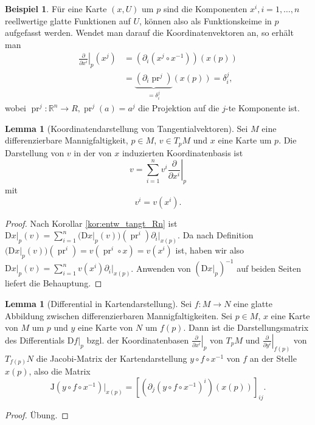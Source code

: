 \documentclass[a4paper]{scrreprt}
\numberwithin{equation}{chapter}
\newcommand{\DD}{\mathrm{D}}
\DeclareMathOperator{\pr}{pr}
\theoremstyle{definition}
\newtheorem{lemma}[defn]{Lemma}
\newtheorem{bsp}[defn]{Beispiel}
\newcommand{\bewUeb}{\begin{proof}Übung.\end{proof}}
\begin{document}
\begin{bsp}
	Für eine Karte $(x,U)$ um $p$ sind die Komponenten $x^i, i = 1,\dots, n$ reellwertige glatte Funktionen auf $U$, können also als Funktionskeime in $p$ aufgefasst werden. Wendet man darauf die Koordinatenvektoren an, so erhält man
	\begin{align*}
		\left.\frac{\partial}{\partial x^i}\right|_p (x^j) &= \left(\partial_i \left(x^j\circ x^{-1}\right)\right) (x(p))\\
		&= \underbrace{\left(\partial_i \pr^j\right)}_{= \delta^j_i} (x(p)) = \delta^j_i,
	\end{align*}
	wobei $\pr^j\colon \mathbb R^n \to R, \pr^j(a) = a^j$ die Projektion auf die $j$-te Komponente ist.
\end{bsp}

\begin{lemma}[Koordinatendarstellung von Tangentialvektoren]
	Sei $M$ eine differenzierbare Mannigfaltigkeit, $p \in M$, $v \in T_pM$ und $x$ eine Karte um $p$. Die Darstellung von $v$ in der von $x$ induzierten Koordinatenbasis ist
	\[v = \sum_{i=1}^n v^i \left.\frac{\partial}{\partial x^i}\right|_p\]
	mit
	\[v^i = v(x^i).\]

	\begin{proof}
		Nach Korollar \ref{kor:entw_tangt_Rn} ist $\left.\DD x\right|_p(v) = \sum_{i=1}^n \Big(\DD x\big|_p(v)\Big) (\pr^i) \left.\partial_i\right|_{x(p)}$. Da nach Definition $\Big(\DD x\big|_p(v)\Big) (\pr^i) = v(\pr^i \circ x) = v(x^i)$ ist, haben wir also $\left.\DD x\right|_p(v) = \sum_{i=1}^n v(x^i) \left.\partial_i\right|_{x(p)}$.
		Anwenden von $\left(\left.\DD x\right|_p\right)^{-1}$ auf beiden Seiten liefert die Behauptung.
	\end{proof}
\end{lemma}

\begin{lemma}[Differential in Kartendarstellung] \label{lemma:differential_koord}
	Sei $f\colon M \to N$ eine glatte Abbildung zwischen differenzierbaren Mannigfaltigkeiten. Sei $p\in M$, $x$ eine Karte von $M$ um $p$ und $y$ eine Karte von $N$ um $f(p)$. Dann ist die Darstellungsmatrix des Differentials $\left.\DD f\right|_p$ bzgl. der Koordinatenbasen $\left.\frac{\partial}{\partial x^i}\right|_p$ von $T_pM$ und $\left.\frac{\partial}{\partial y^i}\right|_{f(p)}$ von $T_{f(p)}N$ die Jacobi-Matrix der Kartendarstellung $y \circ f \circ x^{-1}$ von $f$ an der Stelle $x(p)$, also die Matrix
	\[\mathrm{J}(y\circ f\circ x^{-1})|_{x(p)} = \left[\left(\partial_j(y\circ f\circ x^{-1})^i\right) (x(p)) \right]_{ij}.\]
	\bewUeb
\end{lemma}
\end{document}
